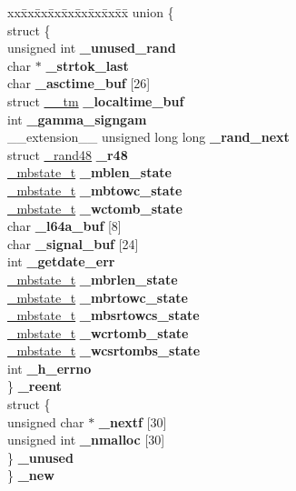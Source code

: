 \begin{DoxyCompactItemize}
\item 
\begin{tabbing}
xx\=xx\=xx\=xx\=xx\=xx\=xx\=xx\=xx\=\kill
union \{\\
\>struct \{\\
\>\>unsigned int {\bfseries \_unused\_rand}\\
\>\>char $\ast$ {\bfseries \_strtok\_last}\\
\>\>char {\bfseries \_asctime\_buf} \mbox{[}26\mbox{]}\\
\>\>struct \hyperlink{struct____tm}{\_\_tm} {\bfseries \_localtime\_buf}\\
\>\>int {\bfseries \_gamma\_signgam}\\
\>\>\_\_extension\_\_ unsigned long long {\bfseries \_rand\_next}\\
\>\>struct \hyperlink{struct__rand48}{\_rand48} {\bfseries \_r48}\\
\>\>\hyperlink{struct__mbstate__t}{\_mbstate\_t} {\bfseries \_mblen\_state}\\
\>\>\hyperlink{struct__mbstate__t}{\_mbstate\_t} {\bfseries \_mbtowc\_state}\\
\>\>\hyperlink{struct__mbstate__t}{\_mbstate\_t} {\bfseries \_wctomb\_state}\\
\>\>char {\bfseries \_l64a\_buf} \mbox{[}8\mbox{]}\\
\>\>char {\bfseries \_signal\_buf} \mbox{[}24\mbox{]}\\
\>\>int {\bfseries \_getdate\_err}\\
\>\>\hyperlink{struct__mbstate__t}{\_mbstate\_t} {\bfseries \_mbrlen\_state}\\
\>\>\hyperlink{struct__mbstate__t}{\_mbstate\_t} {\bfseries \_mbrtowc\_state}\\
\>\>\hyperlink{struct__mbstate__t}{\_mbstate\_t} {\bfseries \_mbsrtowcs\_state}\\
\>\>\hyperlink{struct__mbstate__t}{\_mbstate\_t} {\bfseries \_wcrtomb\_state}\\
\>\>\hyperlink{struct__mbstate__t}{\_mbstate\_t} {\bfseries \_wcsrtombs\_state}\\
\>\>int {\bfseries \_h\_errno}\\
\>\} {\bfseries \_reent}\\
\>struct \{\\
\>\>unsigned char $\ast$ {\bfseries \_nextf} \mbox{[}30\mbox{]}\\
\>\>unsigned int {\bfseries \_nmalloc} \mbox{[}30\mbox{]}\\
\>\} {\bfseries \_unused}\\
\} {\bfseries \_new}\hypertarget{struct__reent_ab96edd51d9384a9f1e8e87e0d5ce7f75}{}\label{struct__reent_ab96edd51d9384a9f1e8e87e0d5ce7f75}
\\


\end{tabbing}
\end{DoxyCompactItemize}
